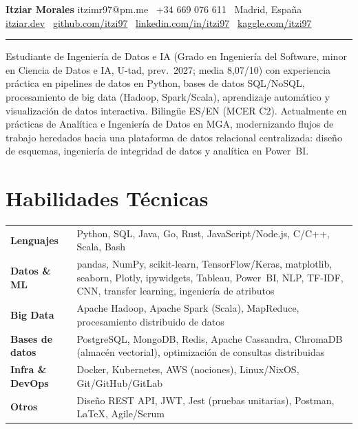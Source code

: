 \documentclass[10pt,a4paper]{article}
\begin{document}
\enlargethispage{1\baselineskip}

{\LARGE\bfseries Itziar Morales}\hfill
{\small itzimr97@pm.me \textbar\ +34 669 076 611 \textbar\ Madrid, Espa\~{n}a}\\
{\small
  \href{https://itziar.dev}{itziar.dev} \textbar\
  \href{https://github.com/itzi97}{github.com/itzi97} \textbar\
  \href{https://www.linkedin.com/in/itzi97}{linkedin.com/in/itzi97} \textbar\
  \href{https://www.kaggle.com/itzi97}{kaggle.com/itzi97}
}
\vspace{3pt}\hrule\vspace{5pt}

{\small
Estudiante de Ingenier\'ia de Datos e IA (Grado en Ingenier\'ia del Software, minor en Ciencia de Datos e IA,
U-tad, prev.\ 2027; media 8{,}07/10) con experiencia pr\'actica en pipelines de datos en Python, bases de
datos SQL/NoSQL, procesamiento de big data (Hadoop, Spark/Scala), aprendizaje autom\'atico y visualizaci\'on
de datos interactiva. Biling\"ue ES/EN (MCER C2). Actualmente en pr\'acticas de Anal\'itica e Ingenier\'ia de
Datos en MGA, modernizando flujos de trabajo heredados hacia una plataforma de datos relacional centralizada:
dise\~{n}o de esquemas, ingenier\'ia de integridad de datos y anal\'itica en Power~BI.
}
\vspace{3pt}

\section{Habilidades T\'{e}cnicas}
{\small
\begin{tabularx}{\linewidth}{@{} l X @{}}
  \textbf{Lenguajes} &
    Python, SQL, Java, Go, Rust, JavaScript/Node.js, C/C++, Scala, Bash \\
  \textbf{Datos \& ML} &
    pandas, NumPy, scikit-learn, TensorFlow/Keras, matplotlib, seaborn,
    Plotly, ipywidgets, Tableau, Power~BI, NLP, TF-IDF, CNN, transfer learning, ingenier\'ia de atributos \\
  \textbf{Big Data} &
    Apache Hadoop, Apache Spark (Scala), MapReduce, procesamiento distribuido de datos \\
  \textbf{Bases de datos} &
    PostgreSQL, MongoDB, Redis, Apache Cassandra, ChromaDB (almac\'en vectorial),
    optimizaci\'on de consultas distribuidas \\
  \textbf{Infra \& DevOps} &
    Docker, Kubernetes, AWS (nociones), Linux/NixOS, Git/GitHub/GitLab \\
  \textbf{Otros} &
    Dise\~{n}o REST API, JWT, Jest (pruebas unitarias), Postman, \LaTeX, Agile/Scrum \\
\end{tabularx}
}
\end{document}
